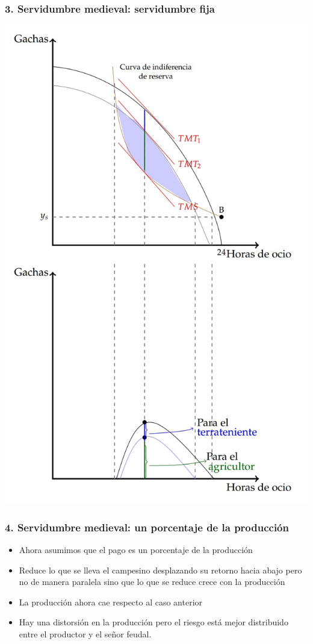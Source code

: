 \documentclass{beamer}
\begin{document}
\begin{frame}
\frametitle{3. Servidumbre medieval: servidumbre fija }
\centering
\includegraphics[scale=0.55]{Slides Principios de Economia/Figures/Instituciones3.jpg}
\end{frame}

\begin{frame}
\frametitle{4. Servidumbre medieval: un porcentaje de la producción }
\begin{itemize}
    \item Ahora asumimos que el pago es un porcentaje de la producción 
    \item Reduce lo que se lleva el campesino desplazando su retorno hacia abajo pero no de manera paralela sino que lo que se reduce crece con la producción
    \item La producción ahora cae respecto al caso anterior
     \item Hay una distorsión en la producción pero el riesgo está mejor distribuido entre el productor y el señor feudal. 
\end{itemize}
\end{frame}
\end{document}
